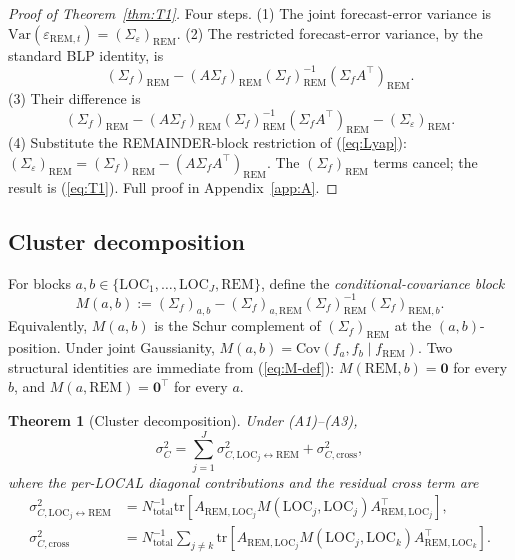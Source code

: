 \documentclass[11pt,letterpaper]{article}
\newtheorem{theorem}{Theorem}
\theoremstyle{remark}
\newcommand{\REM}{\mathrm{REM}}
\newcommand{\LOC}{\mathrm{LOC}}
\newcommand{\Ntot}{N_{\mathrm{total}}}
\newcommand{\trace}{\mathrm{tr}}
\newcommand{\Var}{\mathrm{Var}}
\newcommand{\Cov}{\mathrm{Cov}}
\begin{document}
\begin{proof}[Proof of Theorem~\ref{thm:T1}]
Four steps. (1) The joint forecast-error variance is $\Var(\varepsilon_{\REM, t}) = (\Sigma_\varepsilon)_\REM$. (2) The restricted forecast-error variance, by the standard BLP identity, is
\begin{equation*}
(\Sigma_f)_\REM - (A \Sigma_f)_\REM (\Sigma_f)_\REM^{-1} (\Sigma_f A^\top)_\REM.
\end{equation*}
(3) Their difference is
\begin{equation*}
(\Sigma_f)_\REM - (A \Sigma_f)_\REM (\Sigma_f)_\REM^{-1} (\Sigma_f A^\top)_\REM - (\Sigma_\varepsilon)_\REM.
\end{equation*}
(4) Substitute the REMAINDER-block restriction of (\ref{eq:Lyap}): $(\Sigma_\varepsilon)_\REM = (\Sigma_f)_\REM - (A \Sigma_f A^\top)_\REM$. The $(\Sigma_f)_\REM$ terms cancel; the result is (\ref{eq:T1}). Full proof in Appendix~\ref{app:A}.
\end{proof}

\subsection{Cluster decomposition}\label{sec:T2}

For blocks $a, b \in \{\LOC_1, \ldots, \LOC_J, \REM\}$, define the \emph{conditional-covariance block}
\begin{equation}\label{eq:M-def}
M(a, b) := (\Sigma_f)_{a, b} - (\Sigma_f)_{a, \REM} (\Sigma_f)_\REM^{-1} (\Sigma_f)_{\REM, b}.
\end{equation}
Equivalently, $M(a, b)$ is the Schur complement of $(\Sigma_f)_\REM$ at the $(a, b)$-position. Under joint Gaussianity, $M(a, b) = \Cov(f_a, f_b \mid f_\REM)$. Two structural identities are immediate from (\ref{eq:M-def}): $M(\REM, b) = \mathbf{0}$ for every $b$, and $M(a, \REM) = \mathbf{0}^\top$ for every $a$.

\begin{theorem}[Cluster decomposition]\label{thm:T2}
Under (A1)--(A3),
\begin{equation}\label{eq:T2}
\sigma^2_C = \sum_{j=1}^{J} \sigma^2_{C, \LOC_j \leftrightarrow \REM} + \sigma^2_{C, \mathrm{cross}},
\end{equation}
where the per-LOCAL diagonal contributions and the residual cross term are
\begin{align}
\sigma^2_{C, \LOC_j \leftrightarrow \REM} &= \Ntot^{-1} \trace[A_{\REM, \LOC_j} M(\LOC_j, \LOC_j) A_{\REM, \LOC_j}^\top], \label{eq:T2a} \\
\sigma^2_{C, \mathrm{cross}} &= \Ntot^{-1} \sum_{j \ne k} \trace[A_{\REM, \LOC_j} M(\LOC_j, \LOC_k) A_{\REM, \LOC_k}^\top]. \label{eq:T2b}
\end{align}
\end{theorem}
\end{document}
